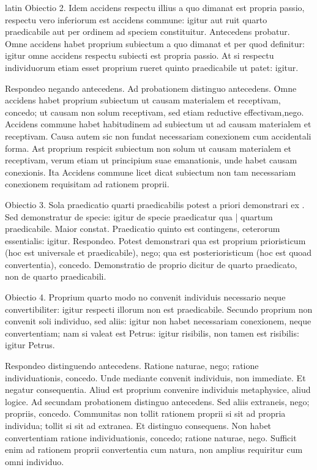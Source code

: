 \begin{otherlanguage*}{latin}
\pstart
Obiectio 2. Idem accidens respectu illius a quo dimanat est propria passio, respectu vero inferiorum est accidens commune:
igitur aut ruit quarto praedicabile aut per ordinem ad speciem constituitur. Antecedens probatur. Omne accidens habet proprium subiectum a quo dimanat et per quod definitur:
igitur omne accidens respectu subiecti est propria passio. At si respectu individuorum etiam esset proprium rueret quinto praedicabile ut patet:
igitur. 
\pend

\pstart
Respondeo negando antecedens. Ad probationem distinguo antecedens. Omne accidens habet proprium subiectum ut causam materialem et receptivam, concedo; ut causam non solum receptivam, sed etiam reductive effectivam,nego. Accidens commune habet habitudinem ad subiectum ut ad causam materialem et receptivam. Causa autem sic non fundat necessariam conexionem cum accidentali forma. Ast proprium respicit subiectum non solum ut causam materialem et receptivam, verum etiam ut principium suae emanationis, unde habet causam conexionis. Ita  Accidens commune licet dicat subiectum non tam necessariam conexionem requisitam ad rationem proprii. 
\pend

\pstart
Obiectio 3. Sola praedicatio quarti praedicabilis potest a priori demonstrari ex . Sed demonstratur de specie:
igitur de specie praedicatur qua \textnormal{|} quartum praedicabile. Maior constat. Praedicatio quinto est contingens, ceterorum essentialis:
igitur. Respondeo. Potest demonstrari qua est proprium prioristicum (hoc est universale et praedicabile), nego; qua est posterioristicum (hoc est quoad convertentia), concedo. Demonstratio de proprio dicitur de quarto praedicato, non de quarto praedicabili. 
\pend

\pstart
Obiectio 4. Proprium quarto modo no convenit individuis necessario neque convertibiliter:
igitur respecti illorum non est praedicabile. Secundo proprium non convenit soli individuo, sed aliis:
igitur non habet necessariam conexionem, neque convertentiam; nam si valeat est Petrus:
igitur risibilis, non tamen est risibilis:
igitur Petrus. 
\pend

\pstart
Respondeo distinguendo antecedens. Ratione naturae, nego; ratione individuationis, concedo. Unde mediante convenit individuis, non immediate. Et negatur consequentia. Aliud est proprium convenire individuis metaphysice, aliud logice. Ad secundam probationem distinguo antecedens. Sed aliis extraneis, nego; propriis, concedo. Communitas non tollit rationem proprii si sit ad propria individua; tollit si sit ad extranea. Et distinguo consequens. Non habet convertentiam ratione individuationis, concedo; ratione naturae, nego. Sufficit enim ad rationem proprii convertentia cum natura, non amplius requiritur cum omni individuo. 
\pend


\end{otherlanguage*}
